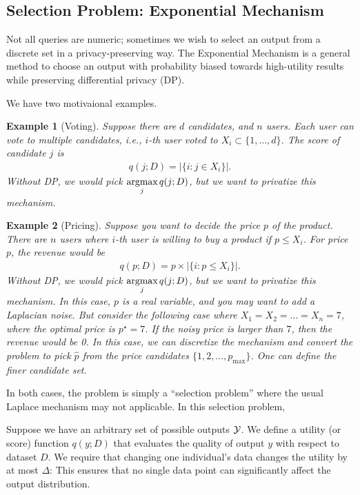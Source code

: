 \documentclass[11pt, a4paper]{article}
\newtheorem{example}{Example}
\begin{document}
\subsection{Selection Problem: Exponential Mechanism}
Not all queries are numeric; sometimes we wish to select an output from a discrete set in a privacy-preserving way.
The Exponential Mechanism \cite{DworkRoth2014} is a general method to choose an output with probability biased 
towards high-utility results while preserving differential privacy (DP).

We have two motivaional examples.
\begin{example}[Voting]
    Suppose there are $d$ candidates, and $n$ users.
    Each user can vote to multiple candidates, i.e., $i$-th user voted to $X_i\subset\{1, \dots, d\}$.
    The score of candidate $j$ is
    \begin{align}
        q(j;D) = |\{i:j\in X_i\}|.
    \end{align}
    Without DP, we would pick $\mathop{\mbox{{\rm argmax}}}\limits_j q(j;D)$, but we want to privatize this mechanism.
\end{example}
\begin{example}[Pricing]
    Suppose you want to decide the price $p$ of the product.
    There are $n$ users where $i$-th user is willing to buy a product if $p\leq X_i$.
    For price $p$, the revenue would be
    \begin{align}
        q(p;D) = p \times  | \{i: p\leq X_i\}|.
    \end{align}
    Without DP, we would pick $\mathop{\mbox{{\rm argmax}}}\limits_j q(j;D)$, but we want to privatize this mechanism.
    In this case, $p$ is a real variable, and you may want to add a Laplacian noise.
    But consider the following case where $X_1=X_2=\dots = X_n = 7$, where the optimal price is $p^\star = 7$.
    If the noisy price is larger than $7$, then the revenue would be 0.
    In this case, we can discretize the mechanism and convert the problem to pick $\hat{p}$ from the price candidates
    $\{1, 2, ..., p_{\max}\}$.
    One can define the finer candidate set.
\end{example}
In both cases, the problem is simply a ``selection problem'' where the usual Laplace mechanism may not applicable.
In this selection problem, 

Suppose we have an arbitrary set of possible outputs ${\cal Y}$.
We define a utility (or score) function $q(y; D)$ that evaluates the quality of output $y$ with respect to dataset $D$.
We require that changing one individual's data changes the utility by at most $\Delta$:
This ensures that no single data point can significantly affect the output distribution.
\end{document}
